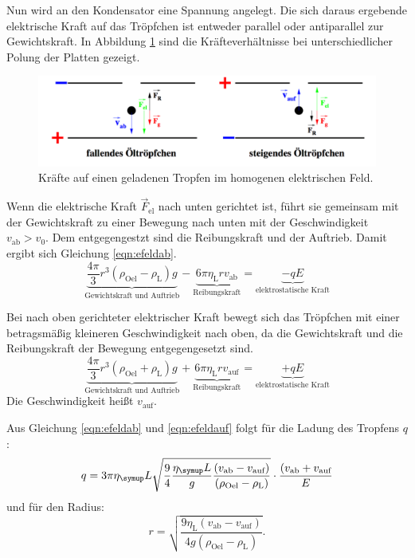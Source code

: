 Nun wird an den Kondensator eine Spannung angelegt. Die sich daraus ergebende
elektrische Kraft auf das Tröpfchen ist entweder parallel oder antiparallel zur
Gewichtskraft.
In Abbildung \ref{fig:troepfchenimefeld} sind die Kräfteverhältnisse
bei unterschiedlicher Polung der Platten gezeigt.
\begin{figure}
  \centering
  \includegraphics[width = \textwidth]{PicturePerfect/troepfchenimefeld.pdf}
  \caption{Kräfte auf einen geladenen Tropfen im homogenen elektrischen Feld.\cite{anleitung}}
  \label{fig:troepfchenimefeld}
\end{figure}
Wenn die elektrische Kraft $\vec{F}_\text{el}$ nach unten gerichtet ist, führt sie gemeinsam mit
der Gewichtskraft zu einer Bewegung nach unten mit der Geschwindigkeit $v_\text{ab} > v_0$. Dem entgegengestzt sind die
Reibungskraft und der Auftrieb. Damit ergibt sich Gleichung \eqref{eqn:efeldab}.
\begin{equation}
  \underbrace{\frac{4\pi}{3} r^3 (\rho_\text{Oel}-\rho_\text{L})g}_\text{Gewichtskraft und Auftrieb}
  - \underbrace{6 \pi \eta_\text{L} r v_\text{ab}}_\text{Reibungskraft}
  = \underbrace{-q E}_\text{elektrostatische Kraft}
  \label{eqn:efeldab}
\end{equation}

Bei nach oben gerichteter elektrischer Kraft bewegt sich das Tröpfchen mit einer betragsmäßig kleineren
Geschwindigkeit nach oben, da die Gewichtskraft und die Reibungskraft der Bewegung entgegengesetzt sind.
\begin{equation}
  \underbrace{\frac{4\pi}{3} r^3 (\rho_\text{Oel}+\rho_\text{L})g}_\text{Gewichtskraft und Auftrieb}
  + \underbrace{6 \pi \eta_\text{L} r v_\text{auf}}_\text{Reibungskraft}
  = \underbrace{+ q E}_\text{elektrostatische Kraft}
  \label{eqn:efeldauf}
\end{equation}
Die Geschwindigkeit heißt $v_\text{auf}$.

Aus Gleichung \eqref{eqn:efeldab} und \eqref{eqn:efeldauf} folgt für die Ladung
des Tropfens $q$:
\begin{equation}
  q = 3 \pi \eta_\g{L} \sqrt{\frac{9}{4}\frac{\eta_\g{L}}{g}\frac{(v_\text{ab}-v_\text{auf})}{(\rho_\text{Oel}-\rho_\text{L})}}
  \cdot \frac{(v_\text{ab} + v_\text{auf}}{E}
  \label{eqn:ladung}
\end{equation}
und für den Radius:
\begin{equation}
  r = \sqrt{\frac{9 \eta_\text{L} (v_\text{ab}-v_\text{auf})}{4 g (\rho_\text{Oel}-\rho_\text{L})}}.
  \label{eqn:Radius}
\end{equation}

